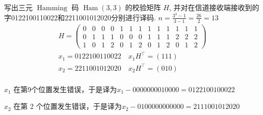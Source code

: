   \begin{tcolorbox}[breakable,colback=blue!5!white,colframe=blue!75!black,
 title= 解答题]
 
写出三元 $ \operatorname{Hamming} $ 码 $ \operatorname{Ham}(3,3) $ 的校验矩阵 $ H $, 并对在信道接收端接收到的字0122100110022和2211001012020分别进行译码.
 \tcblower
 $n=\frac{3^{3}-1}{3-1}=\frac{26}{2}=13$
$$
\begin{array}{c}
H=\left(\begin{array}{lllllllllllll}
0 & 0 & 0 & 0 & 1 & 1 & 1 & 1 & 1 & 1 & 1 & 1 & 1 \\
0 & 1 & 1 & 1 & 0 & 0 & 0 & 1 & 1 & 1 & 2 & 2 & 2 \\
1 & 0 & 1 & 2 & 0 & 1 & 2 & 0 & 1 & 2 & 0 & 1 & 2
\end{array}\right) \\
x_{1}=0122100110022 \quad x_{1} H^{\top}=(111) \\
x_{2}=2211001012020 \quad x_{2} H^{\top}=(0 1 0) \\
\end{array}
$$

$x_1$ 在第9个位置发生错误，于是译为$x_{1}-0000000010000=0122100100022$

$x_{2}$ 在第 2 个位置发生错误，于是译为$x_{2}-0100000000000=2111001012020$
 \end{tcolorbox}
